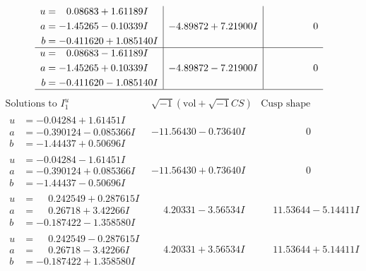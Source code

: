 \documentclass[1p]{elsarticle_modified}
\theoremstyle{definition}
\newcommand{\I}{\sqrt{-1}}
\begin{document}
$$\begin{array}{c|c|c}
\begin{aligned}
u &= \phantom{-}0.08683 + 1.61189 I \\
a &= -1.45265 - 0.10339 I \\
b &= -0.411620 + 1.085140 I\end{aligned}
 & -4.89872 + 7.21900 I & \phantom{-0.000000 } 0 \\ \hline\begin{aligned}
u &= \phantom{-}0.08683 - 1.61189 I \\
a &= -1.45265 + 0.10339 I \\
b &= -0.411620 - 1.085140 I\end{aligned}
 & -4.89872 - 7.21900 I & \phantom{-0.000000 } 0\\
 \hline 
 \end{array}$$\newpage$$\begin{array}{c|c|c}  
\text{Solutions to }I^u_{1}& \I (\text{vol} + \sqrt{-1}CS) & \text{Cusp shape}\\
 \hline 
\begin{aligned}
u &= -0.04284 + 1.61451 I \\
a &= -0.390124 - 0.085366 I \\
b &= -1.44437 + 0.50696 I\end{aligned}
 & -11.56430 - 0.73640 I & \phantom{-0.000000 } 0 \\ \hline\begin{aligned}
u &= -0.04284 - 1.61451 I \\
a &= -0.390124 + 0.085366 I \\
b &= -1.44437 - 0.50696 I\end{aligned}
 & -11.56430 + 0.73640 I & \phantom{-0.000000 } 0 \\ \hline\begin{aligned}
u &= \phantom{-}0.242549 + 0.287615 I \\
a &= \phantom{-}0.26718 + 3.42266 I \\
b &= -0.187422 - 1.358580 I\end{aligned}
 & \phantom{-}4.20331 - 3.56534 I & \phantom{-}11.53644 - 5.14411 I \\ \hline\begin{aligned}
u &= \phantom{-}0.242549 - 0.287615 I \\
a &= \phantom{-}0.26718 - 3.42266 I \\
b &= -0.187422 + 1.358580 I\end{aligned}
 & \phantom{-}4.20331 + 3.56534 I & \phantom{-}11.53644 + 5.14411 I \\ \hline\begin{aligned}

\end{aligned}
\end{array}$$
\end{document}
